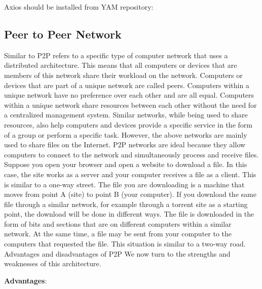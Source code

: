 Axios should be installed from YAM repository:

\newline

\subsection{Peer to Peer Network}
Similar to P2P refers to a specific type of computer network that uses a distributed architecture. This means that all computers or devices that are members of this network share their workload on the network. Computers or devices that are part of a unique network are called peers. Computers within a unique network have no preference over each other and are all equal. Computers within a unique network share resources between each other without the need for a centralized management system.
Similar networks, while being used to share resources, also help computers and devices provide a specific service in the form of a group or perform a specific task. However, the above networks are mainly used to share files on the Internet. P2P networks are ideal because they allow computers to connect to the network and simultaneously process and receive files. Suppose you open your browser and open a website to download a file. In this case, the site works as a server and your computer receives a file as a client. This is similar to a one-way street. The file you are downloading is a machine that moves from point A (site) to point B (your computer).
If you download the same file through a similar network, for example through a torrent site as a starting point, the download will be done in different ways. The file is downloaded in the form of bits and sections that are on different computers within a similar network. At the same time, a file may be sent from your computer to the computers that requested the file. This situation is similar to a two-way road.
Advantages and disadvantages of P2P
We now turn to the strengths and weaknesses of this architecture.

\textbf{Advantages}:

